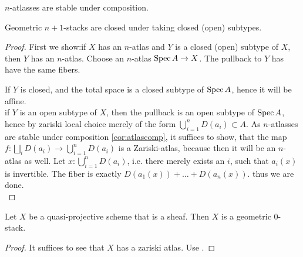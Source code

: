 \documentclass{article}
\begin{document}
\begin{corollary}{\label{cor:atlascomp}}
    $n$-atlasses are stable under composition.
\end{corollary}
\begin{lemma}
Geometric $n+1$-stacks are closed under taking closed (open) subtypes.
\end{lemma}
\begin{proof}
First we show:if $X$ has an $n$-atlas and $Y$ is a closed (open) subtype of $X$, then $Y$ has an $n$-atlas. %
    Choose an $n$-atlas $\operatorname{Spec} A \to X$. The pullback to $Y$ has have the same fibers.
    
    If $Y$ is closed,  and the total space is a closed subtype of $\operatorname{Spec} A$, hence it will be affine. \\
    if $Y$ is an open subtype of $X$, then the pullback is an open subtype of $\operatorname{Spec} A$, hence by zariski local choice merely of the form $\bigcup_{i=1}^n D(a_i) \subset A$. 
    As $n$-atlasses are stable under composition \ref{cor:atlascomp}, it suffices to show, that the map $f : \bigsqcup_i D(a_i) \to \bigcup_{i=1}^n D(a_i)$ is a Zariski-atlas, because then it will be an $n$-atlas as well. Let $x : \bigcup_{i=1}^n D(a_i)$, i.e. there merely exists an $i$, such that $a_i(x)$ is invertible. The fiber is exactly $D(a_1(x)) + \hdots + D(a_n(x))$. thus we are done. \\
    \end{proof}
\begin{corollary}
    Let $X$ be a quasi-projective scheme that is a sheaf. Then $X$ is a geometric 0-stack. 
\end{corollary}   
\begin{proof}
    It suffices to see that $X$ has a zariski atlas. Use \label{ex:PnIsStack}.
\end{proof}
\end{document}
